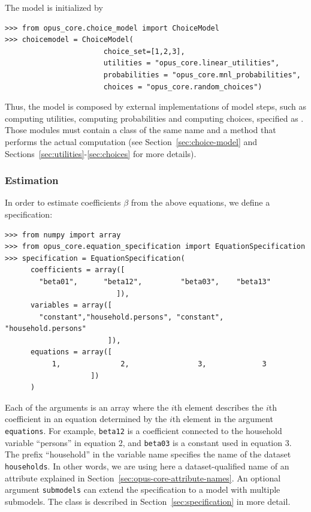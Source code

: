 The model is initialized by
\begin{verbatim}
>>> from opus_core.choice_model import ChoiceModel
>>> choicemodel = ChoiceModel(
                       choice_set=[1,2,3],
                       utilities = "opus_core.linear_utilities",
                       probabilities = "opus_core.mnl_probabilities",
                       choices = "opus_core.random_choices")
\end{verbatim}
Thus, the model is composed by external implementations of model steps, such
as computing utilities, computing probabilities and computing choices,
specified as . Those modules must contain a
class of the same name and a method  that performs the actual
computation (see Section~\ref{sec:choice-model} and Sections~\ref{sec:utilities}-\ref{sec:choices}
for more details).

%
\subsubsection{Estimation}
%
In order to estimate coefficients $\beta$ from the above equations, we define
a specification:


\begin{verbatim}
>>> from numpy import array
>>> from opus_core.equation_specification import EquationSpecification
>>> specification = EquationSpecification(
      coefficients = array([
        "beta01",      "beta12",         "beta03",    "beta13"
                          ]),
      variables = array([
        "constant","household.persons", "constant", "household.persons"
                        ]),
      equations = array([
           1,              2,                3,             3
                    ])
      )
\end{verbatim}
Each of the arguments is an array where the $i$th element describes the $i$th
coefficient in an equation determined by the $i$th element in the argument
\verb|equations|. For example, \verb|beta12| is a coefficient connected to the
household variable ``persons'' in equation 2, and \verb|beta03| is a constant
used in equation 3. The prefix ``household'' in the variable name specifies
the name of the dataset \verb|households|.
In other words, we are using here a dataset-qualified name of an attribute explained in
Section~\ref{sec:opus-core-attribute-names}.
An optional argument \verb|submodels| can extend the specification
to a model with multiple submodels. The  class is described
in Section~\ref{sec:specification} in more detail.


